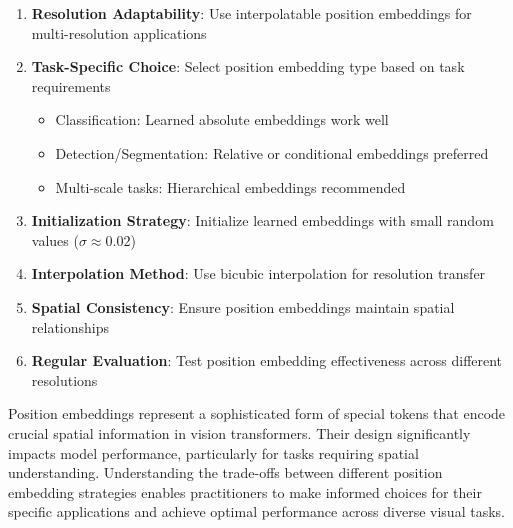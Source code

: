 \begin{enumerate}
\item \textbf{Resolution Adaptability}: Use interpolatable position embeddings for multi-resolution applications
\item \textbf{Task-Specific Choice}: Select position embedding type based on task requirements
    \begin{itemize}
    \item Classification: Learned absolute embeddings work well
    \item Detection/Segmentation: Relative or conditional embeddings preferred
    \item Multi-scale tasks: Hierarchical embeddings recommended
    \end{itemize}
\item \textbf{Initialization Strategy}: Initialize learned embeddings with small random values ($\sigma \approx 0.02$)
\item \textbf{Interpolation Method}: Use bicubic interpolation for resolution transfer
\item \textbf{Spatial Consistency}: Ensure position embeddings maintain spatial relationships
\item \textbf{Regular Evaluation}: Test position embedding effectiveness across different resolutions
\end{enumerate}
\begin{comment}
Feedback: This is a great, detailed list. To make it even more actionable:
1.  **Task-Specific Choice**: "For simple classification on fixed-size images, learned absolute embeddings are a strong and simple baseline. If your application involves object detection or segmentation, the translation invariance of relative position embeddings often provides a significant advantage."
2.  **Interpolation Method**: "When fine-tuning on a new image resolution, always remember to interpolate your learned absolute position embeddings. Forgetting this step is a common reason for poor performance, as the model receives scrambled spatial information. Bicubic interpolation is the standard and effective choice."
\end{comment}

Position embeddings represent a sophisticated form of special tokens that encode crucial spatial information in vision transformers. Their design significantly impacts model performance, particularly for tasks requiring spatial understanding. Understanding the trade-offs between different position embedding strategies enables practitioners to make informed choices for their specific applications and achieve optimal performance across diverse visual tasks.